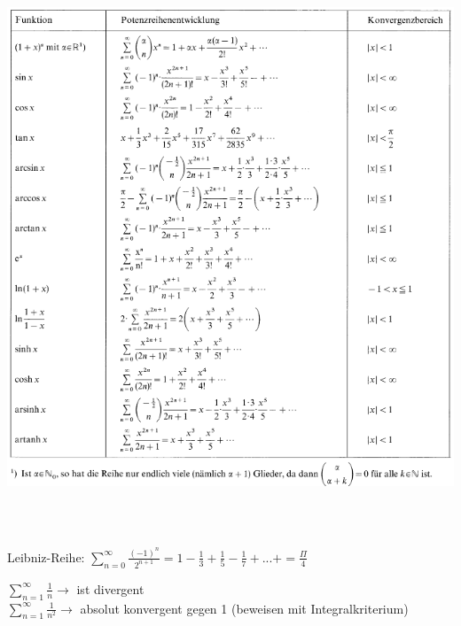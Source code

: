 \includegraphics[height=17.0cm]{./bilder/reihen.png}

	Leibniz-Reihe: $ \sum\limits_{n=0}^{\infty} \frac{(-1)^n}{2^{n+1}} = 1-\frac{1}{3}+\frac{1}{5}-\frac{1}{7}+...+=\frac{\Pi}{4} $

	$\sum\limits_{n=1}^{\infty} \frac{1}{n} \rightarrow$ ist divergent \\
	$\sum\limits_{n=1}^{\infty} \frac{1}{n^2} \rightarrow$ absolut konvergent gegen 1 (beweisen mit Integralkriterium)

\renewcommand{\arraystretch}{1.2}
